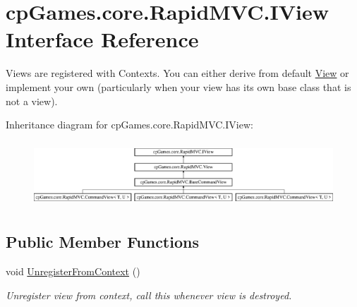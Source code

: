 \hypertarget{interfacecp_games_1_1core_1_1_rapid_m_v_c_1_1_i_view}{}\section{cp\+Games.\+core.\+Rapid\+M\+V\+C.\+I\+View Interface Reference}
\label{interfacecp_games_1_1core_1_1_rapid_m_v_c_1_1_i_view}


Views are registered with Contexts. You can either derive from default \mbox{\hyperlink{classcp_games_1_1core_1_1_rapid_m_v_c_1_1_view}{View}} or implement your own (particularly when your view has its own base class that is not a view).  


Inheritance diagram for cp\+Games.\+core.\+Rapid\+M\+V\+C.\+I\+View\+:\begin{figure}[H]
\begin{center}
\leavevmode
\includegraphics[height=2.472406cm]{interfacecp_games_1_1core_1_1_rapid_m_v_c_1_1_i_view}
\end{center}
\end{figure}
\subsection*{Public Member Functions}
\begin{DoxyCompactItemize}
\item 
void \mbox{\hyperlink{interfacecp_games_1_1core_1_1_rapid_m_v_c_1_1_i_view_a2d09577e2b5475273d73484a8d3ff36d}{Unregister\+From\+Context}} ()
\begin{DoxyCompactList}\small\item\em Unregister view from context, call this whenever view is destroyed. \end{DoxyCompactList}\end{DoxyCompactItemize}

